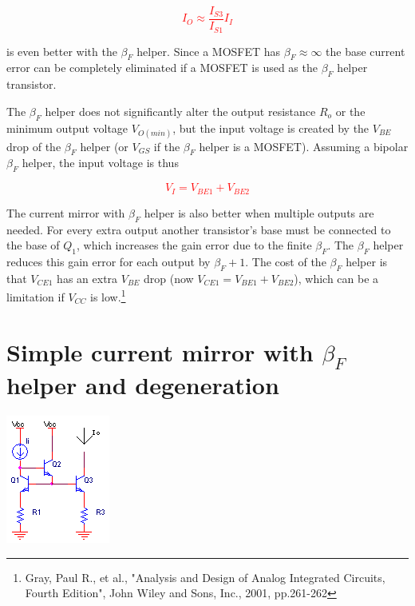 \textcolor{red}{
\begin{equation}
I_{O} \approx \frac{I_{S3}}{I_{S1}}I_{I}
\label{eq:currentmirrorbetahelper_approx}
\end{equation}
}

is even better with the $\beta_{F}$ helper. Since a MOSFET has $\beta_{F} \approx \infty$ the base current error can be completely eliminated if a MOSFET is used as the $\beta_{F}$ helper transistor.
\par
The $\beta_{F}$ helper does not significantly alter the output resistance $R_{o}$ or the minimum output voltage $V_{O(min)}$, but the input voltage is created by the $V_{BE}$ drop of the $\beta_{F}$ helper (or $V_{GS}$ if the $\beta_{F}$ helper is a MOSFET). Assuming a bipolar $\beta_{F}$ helper, the input voltage is thus

\textcolor{red}{
\begin{equation}
V_{I} = V_{BE1} + V_{BE2}
\label{eq:currentmirrorbetahelper_Vi}
\end{equation}
}

\par
The current mirror with $\beta_{F}$ helper is also better when multiple outputs are needed. For every extra output another transistor's base must be connected to the base of $Q_{1}$, which increases the gain error due to the finite $\beta_{F}$. The $\beta_{F}$ helper reduces this gain error for each output by $\beta_{F}+1$. The cost of the $\beta_{F}$ helper is that $V_{CE1}$ has an extra $V_{BE}$ drop (now $V_{CE1} = V_{BE1}+V_{BE2}$), which can be a limitation if $V_{CC}$ is low.\footnote{Gray, Paul R., et al., "Analysis and Design of Analog Integrated Circuits, Fourth Edition", John Wiley and Sons, Inc., 2001, pp.261-262}

\section{Simple current mirror with $\beta_{F}$ helper and degeneration}
\begin{center}
	\includegraphics{schematics/currentmirror_betahelper_degeneration.PNG}
\end{center}

